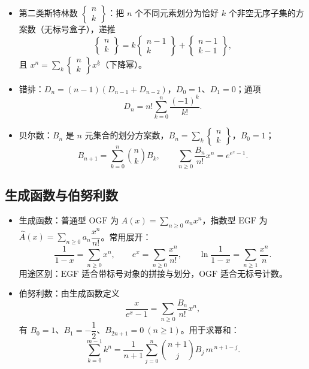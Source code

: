 \documentclass[11pt,a4paper]{ctexart}
\begin{document}
\begin{itemize}
  \item 第二类斯特林数 $\begin{Bmatrix}n\\k\end{Bmatrix}$：把 $n$ 个不同元素划分为恰好 $k$ 个非空无序子集的方案数（无标号盒子），递推
  \[\begin{Bmatrix}n\\k\end{Bmatrix}=k\begin{Bmatrix}n-1\\k\end{Bmatrix}+\begin{Bmatrix}n-1\\k-1\end{Bmatrix},\]
  且 $x^{n}=\sum_{k}\begin{Bmatrix}n\\k\end{Bmatrix}x^{\underline k}$（下降幂）。
  \item 错排：$D_n=(n-1)(D_{n-1}+D_{n-2})$，$D_0=1$、$D_1=0$；通项
  \[D_n=n!\sum_{k=0}^{n}\frac{(-1)^k}{k!}.\]
  \item 贝尔数：$B_n$ 是 $n$ 元集合的划分方案数，$B_n=\sum_{k}\begin{Bmatrix}n\\k\end{Bmatrix}$，$B_0=1$；
  \[B_{n+1}=\sum_{k=0}^{n}\binom{n}{k}B_k,\qquad \sum_{n\ge0}\frac{B_n}{n!}x^{n}=e^{e^x-1}.\]
\end{itemize}

\subsection{生成函数与伯努利数}

\begin{itemize}
  \item 生成函数：普通型 $\mathrm{OGF}$ 为 $A(x)=\sum_{n\ge0}a_nx^{n}$，指数型 $\mathrm{EGF}$ 为 $\widehat A(x)=\sum_{n\ge0}a_n\dfrac{x^{n}}{n!}$。常用展开：
  \[\frac{1}{1-x}=\sum_{n\ge0}x^{n},\qquad e^{x}=\sum_{n\ge0}\frac{x^{n}}{n!},\qquad \ln\frac{1}{1-x}=\sum_{n\ge1}\frac{x^{n}}{n}.\]
  用途区别：$\mathrm{EGF}$ 适合带标号对象的拼接与划分，$\mathrm{OGF}$ 适合无标号计数。
  \item 伯努利数：由生成函数定义
  \[\frac{x}{e^{x}-1}=\sum_{n\ge0}\frac{B_n}{n!}x^{n},\]
  有 $B_0=1$、$B_1=-\dfrac{1}{2}$、$B_{2n+1}=0\ (n\ge1)$。用于求幂和：
  \[\sum_{k=0}^{m-1}k^{n}=\frac{1}{n+1}\sum_{j=0}^{n}\binom{n+1}{j}B_j\,m^{\,n+1-j}.\]
\end{itemize}
\end{document}
